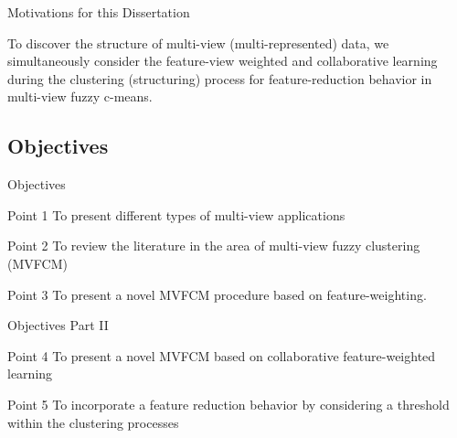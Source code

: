 \documentclass[compress,sky blue]{beamer}
\begin{document}

\begin{frame}{Motivations for this Dissertation}
	\vspace{-0.3cm}	

To discover the structure of multi-view (multi-represented) data, we simultaneously consider the feature-view weighted and collaborative learning during the clustering (structuring) process for feature-reduction behavior in multi-view fuzzy c-means.
	
\end{frame}



\subsection{Objectives}

\begin{frame}{Objectives}
	\vspace{-0.3cm}	

\begin{block}{Point 1}
To present different types of multi-view applications
\end{block}

\begin{block}{Point 2}
To review the literature in the area of multi-view fuzzy clustering (MVFCM) 
\end{block}

\begin{block}{Point 3}
To present a novel MVFCM procedure based on feature-weighting.
\end{block}

	
\end{frame}


\begin{frame}{Objectives Part II}
	\vspace{-0.3cm}	
	
\begin{block}{Point 4}
To present a novel MVFCM based on collaborative feature-weighted learning 
\end{block}

\begin{block}{Point 5}
To incorporate a feature reduction behavior by considering a threshold within the clustering processes 
\end{block}
	
\end{frame}
\end{document}
